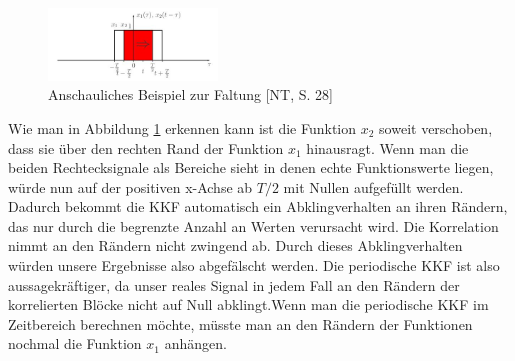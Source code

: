 \begin{figure}[ht!] 
  \centering
     \includegraphics[width=0.4\textwidth]{img/Faltung}
  \caption{Anschauliches Beispiel zur Faltung [NT, S. 28]}
  \label{fig:Bild1}
\end{figure}
Wie man in Abbildung \ref{fig:Bild1} erkennen kann ist die Funktion $x_2$ soweit verschoben, dass sie über den rechten Rand der Funktion $x_1$ hinausragt. Wenn man die beiden Rechtecksignale als Bereiche sieht in denen echte Funktionswerte liegen, würde nun auf der positiven x-Achse ab $T/2$ mit Nullen aufgefüllt werden. Dadurch bekommt die KKF automatisch ein Abklingverhalten an ihren Rändern, das nur durch die begrenzte Anzahl an Werten verursacht wird. Die Korrelation nimmt an den Rändern nicht zwingend ab. Durch dieses Abklingverhalten würden unsere Ergebnisse also abgefälscht werden. Die periodische KKF ist also aussagekräftiger, da unser reales Signal in jedem Fall an den Rändern der korrelierten Blöcke nicht auf Null abklingt.Wenn man die periodische KKF im Zeitbereich berechnen möchte, müsste man an den Rändern der Funktionen nochmal die Funktion $x_1$ anhängen.
